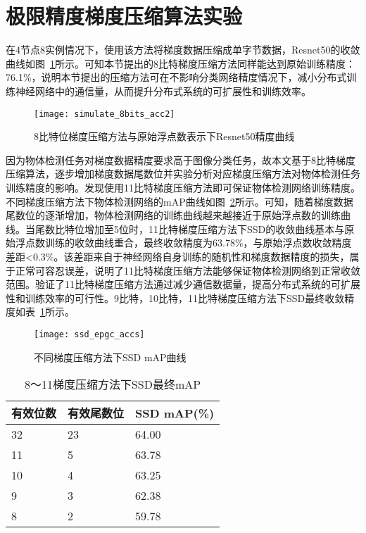 \section{极限精度梯度压缩算法实验}

在4节点8实例情况下，使用该方法将梯度数据压缩成单字节数据，Resnet50的收敛曲线如图~\ref{fig:simulate_8bits_acc}所示。可知本节提出的8比特梯度压缩方法同样能达到原始训练精度：76.1\%，说明本节提出的压缩方法可在不影响分类网络精度情况下，减小分布式训练神经网络中的通信量，从而提升分布式系统的可扩展性和训练效率。
\begin{figure}[htp]
\centering
\texttt{[image: simulate\_8bits\_acc2]}
\caption{8比特位梯度压缩方法与原始浮点数表示下Resnet50精度曲线}
\label{fig:simulate_8bits_acc}
\end{figure}



因为物体检测任务对梯度数据精度要求高于图像分类任务，故本文基于8比特梯度压缩算法，逐步增加梯度数据尾数位并实验分析对应梯度压缩方法对物体检测任务训练精度的影响。发现使用11比特梯度压缩方法即可保证物体检测网络训练精度。不同梯度压缩方法下物体检测网络的mAP曲线如图~\ref{fig:ssd_epgc_accs}所示。可知，随着梯度数据尾数位的逐渐增加，物体检测网络的训练曲线越来越接近于原始浮点数的训练曲线。当尾数比特位增加至5位时，11比特梯度压缩方法下SSD的收敛曲线基本与原始浮点数训练的收敛曲线重合，最终收敛精度为63.78\%，与原始浮点数收敛精度差距<0.3\%。该差距来自于神经网络自身训练的随机性和梯度数据精度的损失，属于正常可容忍误差，说明了11比特梯度压缩方法能够保证物体检测网络到正常收敛范围。验证了11比特梯度压缩方法通过减少通信数据量，提高分布式系统的可扩展性和训练效率的可行性。9比特，10比特，11比特梯度压缩方法下SSD最终收敛精度如表~\ref{tab:ssd_epdc_final_accs}所示。

\begin{figure}[htp]
\centering
\texttt{[image: ssd\_epgc\_accs]}
\caption{不同梯度压缩方法下SSD mAP曲线}
\label{fig:ssd_epgc_accs}
\end{figure}

\begin{table}[htb]
\centering
\noindent\begin{minipage}{0.6\textwidth}
\centering
\caption{8～11梯度压缩方法下SSD最终mAP}
\label{tab:ssd_epdc_final_accs}
\begin{tabular}{p{2cm}p{2cm}p{2.5cm}}
\toprule[1.5pt]
有效位数 & 有效尾数位 & SSD mAP(\%) \\\midrule[1pt]
32 & 23 & 64.00 \\
11 & 5 &  63.78 \\
10 & 4 & 63.25 \\
9 & 3 & 62.38 \\
8 & 2 & 59.78 \\
\midrule[1pt]
\end{tabular}
\end{minipage}
\end{table}


